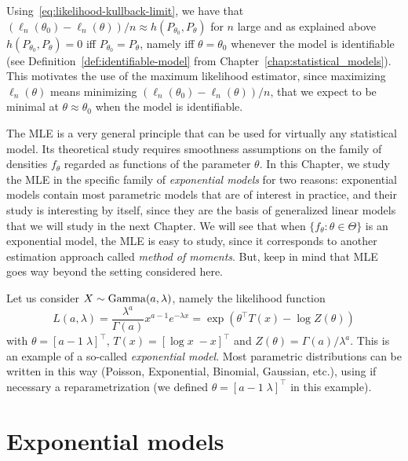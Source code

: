 Using~\eqref{eq:likelihood-kullback-limit}, we have that 
$(\ell_n(\theta_0) - \ell_n(\theta)) / n \approx h(P_{\theta_0}, P_\theta)$ for $n$ large and as explained above 
$h(P_{\theta_0}, P_\theta) = 0$ iff $P_{\theta_0} = P_{\theta}$, namely iff $\theta = \theta_0$ whenever the model is identifiable (see Definition~\ref{def:identifiable-model} from Chapter~\ref{chap:statistical_models}).
This motivates the use of the maximum likelihood estimator, since maximizing $\ell_n(\theta)$ means minimizing $(\ell_n(\theta_0) - \ell_n(\theta)) / n$, that we expect to be minimal at $\theta \approx \theta_0$ when the model is identifiable.

The MLE is a very general principle that can be used for virtually any statistical model.
Its theoretical study requires smoothness assumptions on the family of densities $f_\theta$ regarded as functions of the parameter $\theta$.
In this Chapter, we study the MLE in the specific family of \emph{exponential models} for two reasons: exponential models contain most parametric models that are of interest in practice, and  their study is interesting by itself, since they are the basis of generalized linear models that we will study in the next Chapter.
We will see that when $\{ f_\theta : \theta \in \Theta \}$ is an exponential model, the MLE is easy to study, since it corresponds to another estimation approach called \emph{method of moments}.
But, keep in mind that MLE goes way beyond the setting considered here.
\begin{example}
	Let us consider $X \sim \operatorname{Gamma}(a, \lambda)$, namely the likelihood function
	\begin{equation*}
		L(a, \lambda) = \frac{\lambda^a}{\Gamma(a)} x^{a - 1} e^{-\lambda x} = \exp( \theta^\top T(x) - \log Z(\theta))
	\end{equation*}
	with $\theta = [a - 1 \; \lambda]^\top$, $T(x) = [\log x \; -x]^\top$ and $Z(\theta) = \Gamma(a) / \lambda^a$.
	This is an example of a so-called \emph{exponential model}. Most parametric distributions can be written in this way (Poisson, Exponential, Binomial, Gaussian, etc.), using if necessary a reparametrization (we defined $\theta = [a - 1 \; \lambda]^\top$ in this example).
\end{example}

\section{Exponential models} %
\label{sec:exponential_models}

